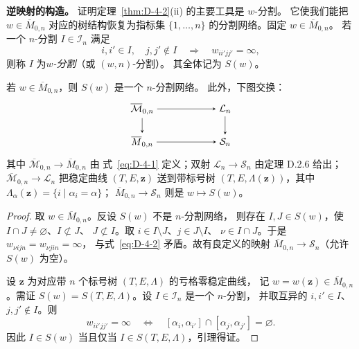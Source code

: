 \noindent\textbf{逆映射的构造。}
证明定理~\ref{thm:D-4-2}(ii) 的主要工具是 $w$-分割。
它使我们能把 $w\in\overline M_{0,n}$ 对应的树结构恢复为指标集
$\{1,\ldots,n\}$ 的分割网络。固定 $w\in\overline M_{0,n}$。
若一个 $n$-分割 $I\in\mathcal I_n$ 满足
\[
  i,i'\in I,\quad j,j'\notin I
  \quad\Longrightarrow\quad w_{ii'jj'}=\infty,
\]
则称 $I$ 为\emph{$w$-分割}（或 $(w,n)$-分割）。
其全体记为 $S(w)$。

\begin{lemma}\label{lem:D-4-3}
若 $w\in\overline M_{0,n}$，则 $S(w)$ 是一个 $n$-分割网络。
此外，下图交换：
\begin{equation}\label{eq:D-4-5}
  \begin{tikzpicture}[baseline=(current bounding box.center),>=stealth]
    \node (a) at (0,1.2) {$\overline{\mathcal M}_{0,n}$};
    \node (b) at (3,1.2) {$\mathcal L_n$};
    \node (c) at (0,0) {$\overline M_{0,n}$};
    \node (d) at (3,0) {$\mathcal S_n$};
    \draw[->] (a)--(b); \draw[->] (a)--(c);
    \draw[->] (b)--(d); \draw[->] (c)--(d);
  \end{tikzpicture}
\end{equation}
其中 $\overline{\mathcal M}_{0,n}\to\overline M_{0,n}$ 由
式~\eqref{eq:D-4-1} 定义；双射 $\mathcal L_n\to\mathcal S_n$
由定理 D.2.6 给出；$\overline{\mathcal M}_{0,n}\to\mathcal L_n$
把稳定曲线 $(T,E,\mathbf z)$ 送到带标号树
$(T,E,\Lambda(\mathbf z))$，其中
$\Lambda_\alpha(\mathbf z)=\{i\mid\alpha_i=\alpha\}$；
$\overline M_{0,n}\to\mathcal S_n$ 则是 $w\mapsto S(w)$。
\end{lemma}

\begin{proof}
取 $w\in\overline M_{0,n}$。反设 $S(w)$ 不是 $n$-分割网络，
则存在 $I,J\in S(w)$，使 $I\cap J\ne\varnothing$、$I\not\subset J$、
$J\not\subset I$。取 $i\in I\setminus J$、$j\in J\setminus I$、
$\nu\in I\cap J$。于是 $w_{\nu ijn}=w_{\nu jin}=\infty$，
与式~\eqref{eq:D-4-2} 矛盾。故有良定义的映射
$\overline M_{0,n}\to\mathcal S_n$（允许 $S(w)$ 为空）。

设 $\mathbf z$ 为对应带 $n$ 个标号树 $(T,E,\Lambda)$ 的亏格零稳定曲线，
记 $w=w(\mathbf z)\in\overline M_{0,n}$。需证
$S(w)=S(T,E,\Lambda)$。设 $I\in\mathcal I_n$ 是一个 $n$-分割，
并取互异的 $i,i'\in I$、$j,j'\notin I$。则
\[
  w_{ii'jj'}=\infty
  \quad\Longleftrightarrow\quad
  [\alpha_i,\alpha_{i'}]\cap[\alpha_j,\alpha_{j'}]=\varnothing.
\]
因此 $I\in S(w)$ 当且仅当 $I\in S(T,E,\Lambda)$，引理得证。
\end{proof}

